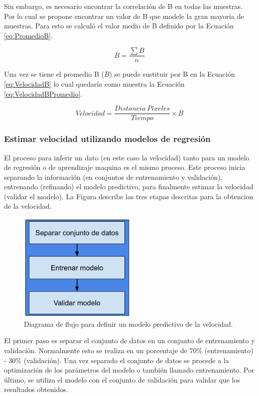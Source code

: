 Sin embargo, es necesario encontrar la correlación de B en todas las muestras. Por lo cual se propone encontrar un valor de B que modele la gran mayoría de muestras. Para esto se calculó el valor medio de B definido por la Ecuación \ref{eq:PromedioB}.

\begin{equation}
    \label{eq:PromedioB}
    \overline{B} = \frac{\sum B}{n}
\end{equation}

Una vez se tiene el promedio B ($\overline{B}$) se puede sustituir por B en la Ecuación \ref{eq:VelocidadB} lo cual quedaría como muestra la Ecuación \ref{eq:VelocidadBPromedio}.

\begin{equation}
    \label{eq:VelocidadBPromedio}
    Velocidad = \frac{Distancia \: Pixeles}{Tiempo} \times \overline{B}
\end{equation}



\subsubsection{Estimar velocidad utilizando modelos de regresión}
\label{cap:RegressionEstimar}

El proceso para inferir un dato (en este caso la velocidad) tanto para un modelo de regresión o de aprendizaje maquina es el mismo proceso. Este proceso inicia separando la información (en conjuntos de entrenamiento y validación), entrenando (refinando) el modelo predictivo, para finalmente estimar la velocidad (validar el modelo). La  Figura \label{ref:ModeloScikitTensorFlow} describe las tres etapas descritas para la obtencion de la velocidad.%


\begin{figure}[H]
    \centering
    \includegraphics[width=0.5\textwidth]{Metodologia/imgs/DFDefinirModelo.png}
    \caption{Diagrama de flujo para definir un modelo predictivo de la velocidad.}
    \label{fig:ModeloScikitTensorFlow}
\end{figure}

El primer paso es separar el conjunto de datos en un conjunto de entrenamiento y validación. Normalmente esto se realiza en un porcentaje de 70\% (entrenamiento) - 30\% (validación). Una vez separado el conjunto de datos se procede a la optimización de los parámetros del modelo o también llamado entrenamiento. Por último, se utiliza el modelo con el conjunto de validación para validar que los resultados obtenidos.

